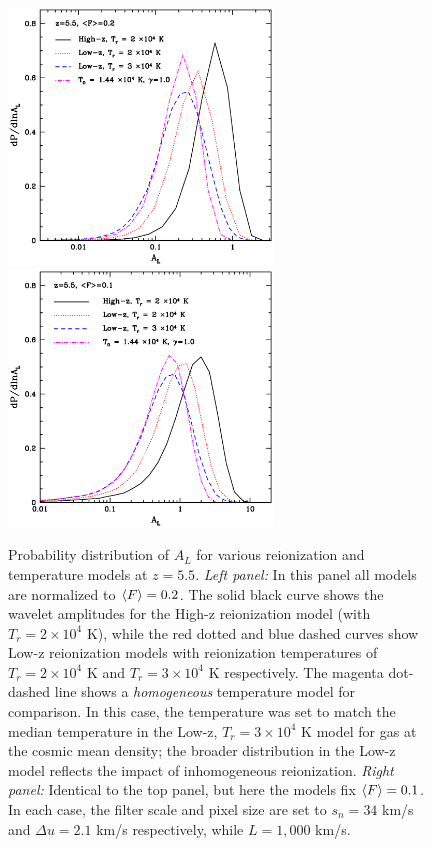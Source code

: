 \begin{figure}
\bc
\includegraphics[width=7cm]{f14a.eps}
\includegraphics[width=7cm]{f14b.eps}
\caption{Probability distribution of $A_L$ for various reionization and temperature models at $z=5.5$. {\it Left panel:} In this panel all models are normalized
to $\langle F \rangle=0.2$. The solid black curve shows the wavelet amplitudes for the High-z reionization model (with $T_r = 2 \times 10^4$ K), while the red dotted and blue dashed curves show
Low-z reionization models with reionization temperatures of $T_r = 2 \times 10^4$ K and $T_r = 3 \times 10^4$ K respectively. The magenta dot-dashed line
shows a {\em homogeneous} temperature model for comparison. In this case, the temperature was set to match the median temperature in the
 Low-z, $T_r = 3 \times 10^4$ K model for
gas at the cosmic mean density; the broader distribution in the Low-z model reflects the impact of inhomogeneous reionization. 
{\it Right panel:} Identical to the top panel, but here the models fix $\langle F \rangle=0.1$. In each case, the filter scale and pixel size are set to $s_n=34$ km/s and $\Delta u=2.1$ km/s respectively,
while $L=1,000$ km/s.}
\label{fig:pdf_al_inhomog}
\ec
\end{figure}


